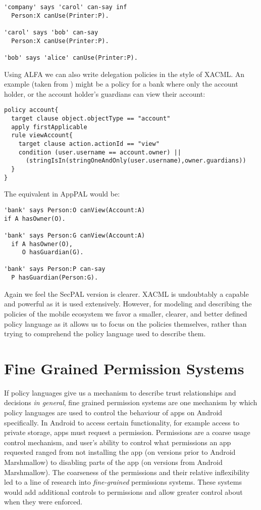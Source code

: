 \documentclass[thesis.tex]{subfiles}
\begin{document}
\begin{lstlisting}
'company' says 'carol' can-say inf
  Person:X canUse(Printer:P).

'carol' says 'bob' can-say
  Person:X canUse(Printer:P).

'bob' says 'alice' canUse(Printer:P).
\end{lstlisting}

Using ALFA we can also write delegation policies in the style of
XACML.  An example (taken from \cite{axiomatics_going_2016}) might be
a policy for a bank where only the account holder, or the account
holder's guardians can view their account:

\begin{lstlisting}
policy account{ 
  target clause object.objectType == "account"
  apply firstApplicable
  rule viewAccount{ 
    target clause action.actionId == "view"
    condition (user.username == account.owner) ||
      (stringIsIn(stringOneAndOnly(user.username),owner.guardians))
  }
}
\end{lstlisting}

The equivalent in AppPAL would be:

\begin{lstlisting}
'bank' says Person:O canView(Account:A)
if A hasOwner(O).

'bank' says Person:G canView(Account:A)
  if A hasOwner(O),
     O hasGuardian(G).

'bank' says Person:P can-say
  P hasGuardian(Person:G).
\end{lstlisting}

Again we feel the SecPAL version is clearer.  XACML is undoubtably a
capable and powerful as it is used extensively.  However, for modeling
and describing the policies of the mobile ecosystem we favor a
smaller, clearer, and better defined policy language as it allows us
to focus on the policies themselves, rather than trying to comprehend
the policy language used to describe them.

\section{Fine Grained Permission Systems}

If policy languages give us a mechanism to describe trust
relationships and decisions \emph{in general}, fine grained permission
systems are one mechanism by which policy languages are used to
control the behaviour of apps on Android specifically.  In Android to
access certain functionality, for example access to private storage,
apps must request a permission.  Permissions are a coarse usage
control mechanism, and user's ability to control what permissions an
app requested ranged from not installing the app (on versions prior to
Android Marshmallow) to disabling parts of the app (on versions from
Android Marshmallow).  The coarseness of the permissions and their
relative inflexibility led to a line of research into
\emph{fine-grained} permissions systems.  These systems would add
additional controls to permissions and allow greater control about
when they were enforced.
\end{document}
